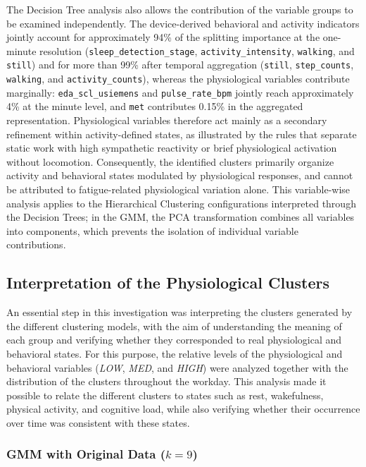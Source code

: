 \documentclass[a4paper,fleqn]{cas-sc}
\newcommand{\newtextpurple}[1]{{\color{revpurple}#1}}
\begin{document}
\newtextpurple{The Decision Tree analysis also allows the contribution of the variable groups to be examined independently. The device-derived behavioral and activity indicators jointly account for approximately 94\% of the splitting importance at the one-minute resolution (\texttt{sleep\_detection\_stage}, \texttt{activity\_intensity}, \texttt{walking}, and \texttt{still}) and for more than 99\% after temporal aggregation (\texttt{still}, \texttt{step\_counts}, \texttt{walking}, and \texttt{activity\_counts}), whereas the physiological variables contribute marginally: \texttt{eda\_scl\_usiemens} and \texttt{pulse\_rate\_bpm} jointly reach approximately 4\% at the minute level, and \texttt{met} contributes 0.15\% in the aggregated representation. Physiological variables therefore act mainly as a secondary refinement within activity-defined states, as illustrated by the rules that separate static work with high sympathetic reactivity or brief physiological activation without locomotion. Consequently, the identified clusters primarily organize activity and behavioral states modulated by physiological responses, and cannot be attributed to fatigue-related physiological variation alone. This variable-wise analysis applies to the Hierarchical Clustering configurations interpreted through the Decision Trees; in the GMM, the PCA transformation combines all variables into components, which prevents the isolation of individual variable contributions.}

\subsection{Interpretation of the Physiological Clusters}

An essential step in this investigation was interpreting the clusters generated by the different clustering models, with the aim of understanding the meaning of each group and verifying whether they corresponded to real physiological and behavioral states. For this purpose, the relative levels of the physiological and behavioral variables (\textit{LOW}, \textit{MED}, and \textit{HIGH}) were analyzed together with the distribution of the clusters throughout the workday. This analysis made it possible to relate the different clusters to states such as rest, wakefulness, physical activity, and cognitive load, while also verifying whether their occurrence over time was consistent with these states.

\subsubsection{GMM with Original Data ($k=9$)}
\end{document}
